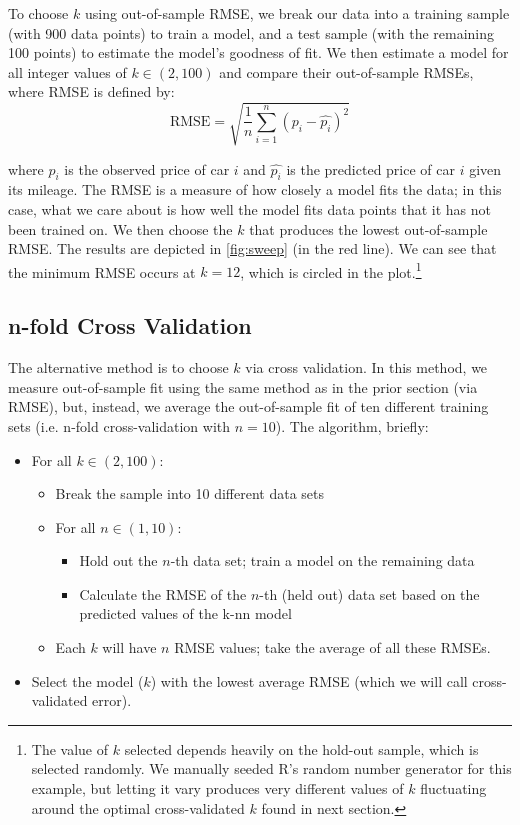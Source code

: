 \documentclass[11pt, fleqn]{article}
\begin{document}
To choose $k$ using out-of-sample RMSE, we break our data into a training sample (with 900 data points) to train a model, and a test sample (with the remaining 100 points) to estimate the model's goodness of fit. We then estimate a model for all integer values of $k \in (2,100)$ and compare their out-of-sample RMSEs, where RMSE is defined by:
\[ \text{RMSE} = \sqrt{\frac{1}{n} \sum_{i=1}^{n} \left( p_i - \hat{p_i} \right)^2} \]

where $p_i$ is the observed price of car $i$ and $\hat{p_i}$ is the predicted price of car $i$ given its mileage. The RMSE is a measure of how closely a model fits the data; in this case, what we care about is how well the model fits data points that it has not been trained on. We then choose the $k$ that produces the lowest out-of-sample RMSE. The results are depicted in \cref{fig:sweep} (in the red line). We can see that the minimum RMSE occurs at $k=12$, which is circled in the plot.\footnote{The value of $k$ selected depends heavily on the hold-out sample, which is selected randomly. We manually seeded R's random number generator for this example, but letting it vary produces very different values of $k$ fluctuating around the optimal cross-validated $k$ found in next section.}

\subsection{n-fold Cross Validation}\label{sec:cv}

The alternative method is to choose $k$ via cross validation. In this method, we measure out-of-sample fit using the same method as in the prior section (via RMSE), but, instead, we average the out-of-sample fit of ten different training sets (i.e. n-fold cross-validation with $n=10$). The algorithm, briefly:
\begin{itemize}
\item For all $k \in (2,100)$:
\begin{itemize}
\item Break the sample into 10 different data sets
\item For all $n \in (1, 10)$:
\begin{itemize}
\item Hold out the $n$-th data set; train a model on the remaining data
\item Calculate the RMSE of the $n$-th (held out) data set based on the predicted values of the k-nn model
\end{itemize}
\item Each $k$ will have $n$ RMSE values; take the average of all these RMSEs.
\end{itemize}
\item Select the model ($k$) with the lowest average RMSE (which we will call cross-validated error).
\end{itemize}
\end{document}
